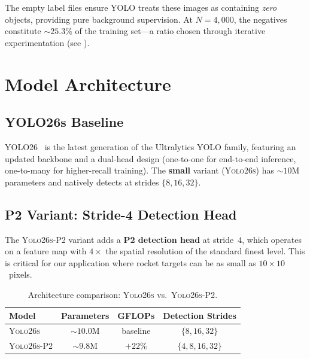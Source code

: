 \documentclass[11pt, a4paper]{article}
\newcommand{\yolobase}{\textsc{Yolo26s}}
\newcommand{\yolop}{\textsc{Yolo26s-P2}}
\begin{document}
The empty label files ensure YOLO treats these images as containing \emph{zero}
objects, providing pure background supervision. At $N=4{,}000$, the negatives
constitute $\sim\!25.3\%$ of the training set---a ratio chosen through
iterative experimentation (see ).

\section{Model Architecture}
\label{sec:arch}

\subsection{YOLO26s Baseline}

YOLO26~\cite{ultralytics2025yolo} is the latest generation of the Ultralytics
YOLO family, featuring an updated backbone and a dual-head design (one-to-one
for end-to-end inference, one-to-many for higher-recall training). The
\textbf{small} variant (\yolobase) has ${\sim}10$M parameters and natively
detects at strides $\{8, 16, 32\}$.

\subsection{P2 Variant: Stride-4 Detection Head}

The \yolop{} variant adds a \textbf{P2 detection head} at stride~$4$, which
operates on a feature map with $4{\times}$ the spatial resolution of the
standard finest level. This is critical for our application where rocket
targets can be as small as $10{\times}10$~pixels.

\begin{table}[h]
  \centering
  \caption{Architecture comparison: \yolobase{} vs.\ \yolop{}.}
  \label{tab:arch}
  \begin{tabular}{@{}lccc@{}}
    \toprule
    \textbf{Model} & \textbf{Parameters} & \textbf{GFLOPs} & \textbf{Detection Strides} \\
    \midrule
    \yolobase{}    & ${\sim}10.0$M       & baseline        & $\{8, 16, 32\}$            \\
    \yolop{}       & ${\sim}9.8$M        & $+22\%$         & $\{4, 8, 16, 32\}$         \\
    \bottomrule
  \end{tabular}
\end{table}
\end{document}
